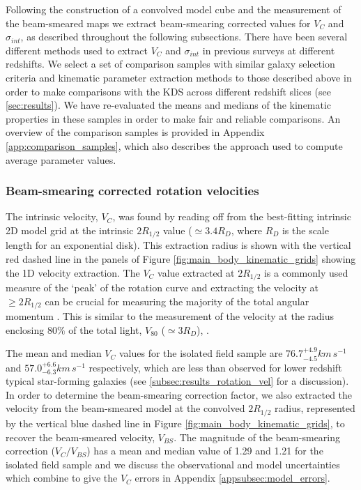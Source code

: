 \documentclass[fleqn,usenatbib]{mnras}
\begin{document}
Following the construction of a convolved model cube and the measurement of the beam-smeared maps we extract beam-smearing corrected values for $V_{C}$ and $\sigma_{int}$, as described throughout the following subsections.
There have been several different methods used to extract $V_{C}$ and $\sigma_{int}$ in previous surveys at different redshifts.
We select a set of comparison samples with similar galaxy selection criteria and kinematic parameter extraction methods to those described above in order to make comparisons with the KDS across different redshift slices (see \cref{sec:results}).
We have re-evaluated the means and medians of the kinematic properties in these samples in order to make fair and reliable comparisons.
An overview of the comparison samples is provided in Appendix \ref{app:comparison_samples}, which also describes the approach used to compute average parameter values.

\subsubsection{Beam-smearing corrected rotation velocities}\label{subsubsec:beam_smearing_corrected_velocities}
The intrinsic velocity, $V_{C}$, was found by reading off from the best-fitting intrinsic 2D model grid at the intrinsic $2R_{1/2}$ value ($\simeq3.4R_{D}$, where $R_{D}$ is the scale length for an exponential disk).
This extraction radius is shown with the vertical red dashed line in the panels of Figure \ref{fig:main_body_kinematic_grids} showing the 1D velocity extraction.
The $V_{C}$ value extracted at $2R_{1/2}$ is a commonly used measure of the `peak' of the rotation curve \citep[e.g.][]{Miller2011,Stott2016,Pelliccia2017,Harrison2017,Swinbank2017} and extracting the velocity at $\geqslant 2R_{1/2}$ can be crucial for measuring the majority of the total angular momentum \citep[e.g.][]{Obreschkow2016,Harrison2017,Swinbank2017}.
This is similar to the measurement of the velocity at the radius enclosing 80$\%$ of the total light, $V_{80}$ ($\simeq3R_{D}$), \citep{Tiley2016}.

The mean and median $V_{C}$ values for the isolated field sample are $76.7^{+4.9}_{-4.5}km\,s^{-1}$ and $57.0^{+6.6}_{-6.3}km\,s^{-1}$ respectively, which are less than observed for lower redshift typical star-forming galaxies (see \cref{subsec:results_rotation_vel} for a discussion).
In order to determine the beam-smearing correction factor, we also extracted the velocity from the beam-smeared model at the convolved $2R_{1/2}$ radius, represented by the vertical blue dashed line in Figure \ref{fig:main_body_kinematic_grids}, to recover the beam-smeared velocity, $V_{BS}$.
The magnitude of the beam-smearing correction ($V_{C}/V_{BS}$) has a mean and median value of 1.29 and 1.21 for the isolated field sample and we discuss the observational and model uncertainties which combine to give the $V_{C}$ errors in Appendix \ref{appsubsec:model_errors}. \\
\end{document}
